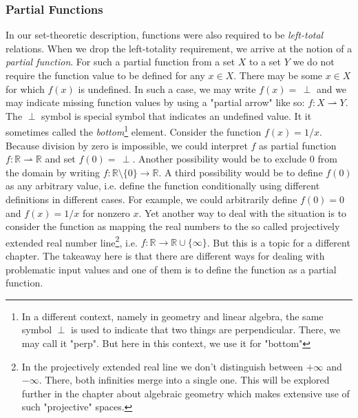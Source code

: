 \subsubsection{Partial Functions}
In our set-theoretic description, functions were also required to be \emph{left-total} relations. When we drop the left-totality requirement, we arrive at the notion of a \emph{partial function}. For such a partial function from a set $X$ to a set $Y$ we do not require the function value to be defined for any $x \in X$. There may be some $x \in X$ for which $f(x)$ is undefined. In such a case, we may write $f(x) = \, \perp$ and we may indicate missing function values by using a "partial arrow" like so: $f: X \rightharpoonup Y$. The $\perp$ symbol is special symbol that indicates an undefined value. It it sometimes called the \emph{bottom}\footnote{In a different context, namely in geometry and linear algebra, the same symbol $\perp$ is used to indicate that two things are perpendicular. There, we may call it "perp". But here in this context, we use it for "bottom"} element. Consider the function $f(x) = 1/x$. Because division by zero is impossible, we could interpret $f$ as partial function $f: \mathbb{R} \rightharpoonup \mathbb{R}$ and set $f(0) = \, \perp$. Another possibility would be to exclude $0$ from the domain by writing $f: \mathbb{R} \setminus \{ 0 \} \rightarrow \mathbb{R}$. A third possibility would be to define $f(0)$ as any arbitrary value, i.e. define the function conditionally using different definitions in different cases. For example, we could arbitrarily define $f(0) = 0$ and $f(x) = 1/x$ for nonzero $x$. Yet another way to deal with the situation is to consider the function as mapping the real numbers to the so called projectively extended real number line\footnote{In the projectively extended real line we don't distinguish between $+\infty$ and $-\infty$. There, both infinities merge into a single one. This will be explored further in the chapter about algebraic geometry which makes extensive use of such "projective" spaces.}, i.e. $f: \mathbb{R} \rightarrow \mathbb{R} \cup \{ \infty \}$. But this is a topic for a different chapter. The takeaway here is that there are different ways for dealing with problematic input values and one of them is to define the function as a partial function.




